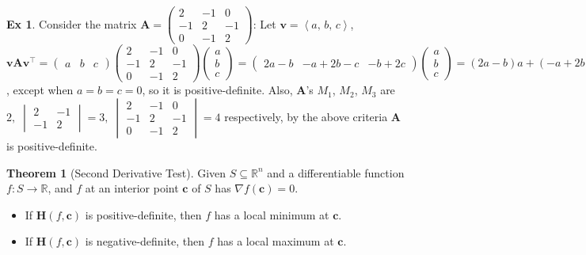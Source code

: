 \documentclass[12pt]{extarticle}
\newcommand{\ds}{\displaystyle}
\newcommand{\llt}{\left\langle}
\newcommand{\rgt}{\right\rangle}
\theoremstyle{definition}
\newtheorem*{thm}{Theorem}
\newtheorem*{ex}{Ex}
\newcommand{\vv}{\mathbf{v}}
\newcommand{\vc}{\mathbf{c}}
\newcommand{\vH}{\mathbf{H}}
\newcommand{\vA}{\mathbf{A}}
\begin{document}
\begin{ex}
  Consider the matrix $\ds\vA = \begin{pmatrix}2 & -1 & 0\\-1 & 2 & -1\\ 0 & -1 & 2\end{pmatrix}$: Let $\ds\vv = \llt a,\,b,\,c\rgt$, $\ds\vv\vA\vv^\top = \begin{pmatrix}a & b & c\end{pmatrix}\begin{pmatrix}2 & -1 & 0\\-1 & 2 & -1\\ 0 & -1 & 2\end{pmatrix}\begin{pmatrix}a\\b\\c\end{pmatrix} = \begin{pmatrix}2a - b&-a + 2b - c&-b + 2c\end{pmatrix}\begin{pmatrix}a\\b\\c\end{pmatrix} = (2a - b)a + (-a + 2b - c)b + (-b + 2c)c = 2a^2-2ab+2b^2 - 2bc + 2c^2 = a^2 + (a - b)^2 + (b - c)^2 + c^2 > 0$, except when $a = b = c = 0$, so it is positive-definite. Also, $\vA$'s $M_1$, $M_2$, $M_3$ are $\ds 2,\;\begin{vmatrix}2 & -1 \\ -1 & 2\end{vmatrix} = 3,\;\begin{vmatrix}2 & -1 & 0\\-1 & 2 & -1\\ 0 & -1 & 2\end{vmatrix} = 4$ respectively, by the above criteria $\vA$ is positive-definite. 
\end{ex}

\begin{thm}[Second Derivative Test]
  Given $\ds S\subseteq\mathbb{R}^n$ and a differentiable function $\ds f:S\to\mathbb{R}$, and $f$ at an interior point $\vc$ of $S$ has $\ds\nabla f(\vc) = 0$. 
  \begin{itemize}\setlength\itemsep{0em}
    \item If $\vH(f, \vc)$ is positive-definite, then $f$ has a local minimum at $\vc$. 
    \item If $\vH(f, \vc)$ is negative-definite, then $f$ has a local maximum at $\vc$. 
  \end{itemize}
\end{thm}
\end{document}
